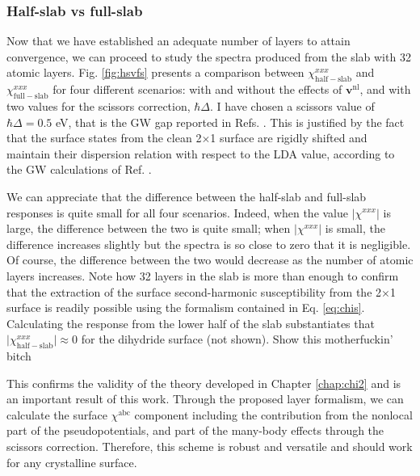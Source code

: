 \subsubsection{Half-slab vs full-slab}

Now that we have established an adequate number of layers to attain convergence,
we can proceed to study the spectra produced from the slab with 32 atomic
layers. Fig. \ref{fig:hsvfs} presents a comparison between
$\chi^{xxx}_{\mathrm{half-slab}}$ and $\chi^{xxx}_{\mathrm{full-slab}}$ for four
different scenarios: with and without the effects of $\mathbf{v}^\mathrm{nl}$,
and with two values for the scissors correction, $\hbar\Delta$. I have chosen a
scissors value of $\hbar\Delta=0.5$ eV, that is the GW gap reported in Refs.
\cite{rohlfingPRB95, garciaCPC01}. This is justified by the fact that the
surface states from the clean 2$\times$1 surface are rigidly shifted and
maintain their dispersion relation with respect to the LDA value, according to
the GW calculations of Ref.
\cite{rohlfingPRB95}.

We can appreciate that the difference between the half-slab and full-slab
responses is quite small for all four scenarios. Indeed, when the value
$\vert\chi^{xxx}\vert$ is large, the difference between the two is quite small;
when $\vert\chi^{xxx}\vert$ is small, the difference increases slightly but the
spectra is so close to zero that it is negligible. Of course, the difference
between the two would decrease as the number of atomic layers increases. Note
how 32 layers in the slab is more than enough to confirm that the extraction of
the surface second-harmonic susceptibility from the 2$\times$1 surface is
readily possible using the formalism contained in Eq. \eqref{eq:chis}.
Calculating the response from the lower half of the slab substantiates that
$\vert\chi^{xxx}_{\mathrm{half-slab}}\vert\approx 0$ for the dihydride surface
(not shown). {\color{red} Show this motherfuckin' bitch}

This confirms the validity of the theory developed in Chapter \ref{chap:chi2}
and is an important result of this work. Through the proposed layer formalism,
we can calculate the surface $\chi^{\mathrm{abc}}$ component including the
contribution from the nonlocal part of the pseudopotentials, and part of the
many-body effects through the scissors correction. Therefore, this scheme is
robust and versatile and should work for any crystalline surface.

